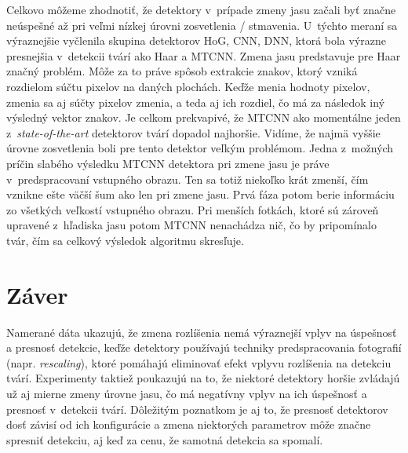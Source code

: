 \documentclass[]{article}
\begin{document}
	Celkovo môžeme zhodnotiť, že detektory v~prípade zmeny jasu začali byť značne neúspešné až pri veľmi nízkej úrovni zosvetlenia / stmavenia. U~týchto meraní sa výraznejšie vyčlenila skupina detektorov HoG, CNN, DNN, ktorá bola výrazne presnejšia v~detekcii tvárí ako Haar a MTCNN. Zmena jasu predstavuje pre Haar značný problém. Môže za to práve spôsob extrakcie znakov, ktorý vzniká rozdielom súčtu pixelov na daných plochách. Keďže menia hodnoty pixelov, zmenia sa aj súčty pixelov zmenia, a teda aj ich rozdiel, čo má za následok iný výsledný vektor znakov. Je celkom prekvapivé, že MTCNN ako momentálne jeden z~\textit{state-of-the-art} detektorov tvárí dopadol najhoršie. Vidíme, že najmä vyššie úrovne zosvetlenia boli pre tento detektor veľkým problémom. Jedna z~možných príčin slabého výsledku MTCNN detektora pri zmene jasu je práve v~predspracovaní vstupného obrazu. Ten sa totiž niekoľko krát zmenší, čím vznikne ešte väčší šum ako len pri zmene jasu. Prvá fáza potom berie informáciu zo všetkých veľkostí vstupného obrazu. Pri menších fotkách, ktoré sú zároveň upravené z~hľadiska jasu potom MTCNN nenachádza nič, čo by pripomínalo tvár, čím sa celkový výsledok algoritmu skresľuje.
	
	\newpage
	\section{Záver}
	
	Namerané dáta ukazujú, že zmena rozlíšenia nemá výraznejší vplyv na úspešnosť a presnosť detekcie, keďže detektory používajú techniky predspracovania fotografií (napr. \textit{rescaling}), ktoré pomáhajú eliminovať efekt vplyvu rozlíšenia na detekciu tvárí. Experimenty taktiež poukazujú na to, že niektoré detektory horšie zvládajú už aj mierne zmeny úrovne jasu, čo má negatívny vplyv na ich úspešnosť a presnosť v~detekcii tvárí. Dôležitým poznatkom je aj to, že presnosť detektorov dosť závisí od ich konfigurácie a zmena niektorých parametrov môže značne spresniť detekciu, aj keď za cenu, že samotná detekcia sa spomalí.
	
	
\end{document}
